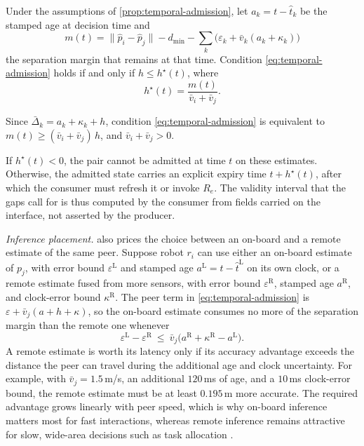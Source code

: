 \begin{corollary}\label{cor:validity-interval}
Under the assumptions of \cref{prop:temporal-admission}, let
$a_k=t-\hat t_k$ be the stamped age at decision time and
\[
  m(t)=\lVert\hat p_i-\hat p_j\rVert-d_{\min}
  -\sum_{k}\bigl(\varepsilon_k+\bar v_k(a_k+\kappa_k)\bigr)
\]
the separation margin that remains at that time.  Condition
\eqref{eq:temporal-admission} holds if and only if $h\le h^\star(t)$, where
\begin{equation}
  h^\star(t)=\frac{m(t)}{\bar v_i+\bar v_j}.
  \label{eq:validity-interval}
\end{equation}
\end{corollary}

\begin{IEEEproof}
Since $\bar\Delta_k=a_k+\kappa_k+h$, condition \eqref{eq:temporal-admission} is
equivalent to $m(t)\ge(\bar v_i+\bar v_j)\,h$, and $\bar v_i+\bar v_j>0$.
\end{IEEEproof}

If $h^\star(t)<0$, the pair cannot be admitted at time $t$ on these estimates.
Otherwise, the admitted state carries an explicit expiry time $t+h^\star(t)$,
after which the consumer must refresh it or invoke $R_e$.  The validity interval
that the gaps call for is thus computed by the consumer from fields carried on
the interface, not asserted by the producer.

\emph{Inference placement.}   also prices the
choice between an on-board and a remote estimate of the same peer.  Suppose
robot $r_i$ can use either an on-board estimate of $p_j$, with error bound
$\varepsilon^{\mathrm L}$ and stamped age $a^{\mathrm L}=t-\hat t^{\mathrm L}$
on its own clock, or a remote estimate fused from more sensors, with error bound
$\varepsilon^{\mathrm R}$, stamped age $a^{\mathrm R}$, and clock-error bound
$\kappa^{\mathrm R}$.  The peer term in \eqref{eq:temporal-admission} is
$\varepsilon+\bar v_j(a+h+\kappa)$, so the on-board estimate consumes no more
of the separation margin than the remote one whenever
\begin{equation}
  \varepsilon^{\mathrm L}-\varepsilon^{\mathrm R}
  \ \le\ \bar v_j\bigl(a^{\mathrm R}+\kappa^{\mathrm R}-a^{\mathrm L}\bigr).
  \label{eq:placement}
\end{equation}
A remote estimate is worth its latency only if its accuracy advantage exceeds
the distance the peer can travel during the additional age and clock
uncertainty.  For example, with $\bar v_j=1.5$\,m/s, an additional
$120$\,ms of age, and a $10$\,ms clock-error bound, the remote estimate must be
at least $0.195$\,m more accurate.  The required advantage grows linearly with
peer speed, which is why on-board inference matters most for fast interactions,
whereas remote inference remains attractive for slow, wide-area decisions such
as task allocation \cite{kehoe2015cloud}.

